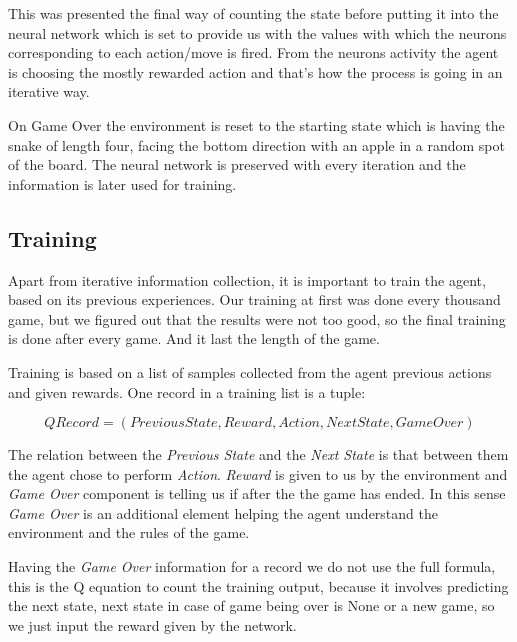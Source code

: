 \documentclass[]{article}
\begin{document}
\newpage

\par This was presented the final way of counting the state before putting it into the neural network which is set to provide us with the values with which the neurons corresponding to each action/move is fired. From the neurons activity the agent is choosing the mostly rewarded action and that's how the process is going in an iterative way. 

\par On Game Over the environment is reset to the starting state which is having the snake of length four, facing the bottom direction with an apple in a random spot of the board. The neural network is preserved with every iteration and the information is later used for training.

\subsection{Training}

\par Apart from iterative information collection, it is important to train the agent, based on its previous experiences. Our training at first was done every thousand game, but we figured out that the results were not too good, so the final training is done after every game. And it last the length of the game.

\par Training is based on a list of samples collected from the agent previous actions and given rewards. One record in a training list is a tuple: 

\begin{equation}
QRecord = (Previous State, Reward, Action, Next State, Game Over)
\end{equation}

\par The relation between the \textit{Previous State} and the \textit{Next State} is that between them the agent chose to perform \textit{Action}. \textit{Reward} is given to us by the environment and \textit{Game Over} component is telling us if after the  the game has ended. In this sense \textit{Game Over} is an additional element helping the agent understand the environment and the rules of the game. 

\par Having the \textit{Game Over} information for a record we do not use the full formula, this is the Q equation to count the training output, because it involves predicting the next state, next state in case of game being over is None or a new game, so we just input the reward given by the network.
\end{document}
